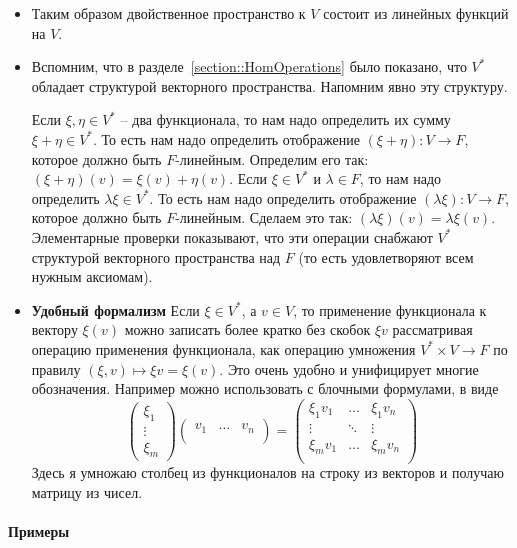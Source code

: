 \begin{itemize}
\item Таким образом двойственное пространство к $V$ состоит из линейных функций на $V$.

\item Вспомним, что в разделе~\ref{section::HomOperations} было показано, что $V^*$ обладает структурой векторного пространства.
Напомним явно эту структуру.

Если $\xi,\eta\in V^*$ -- два функционала, то нам надо определить их сумму $\xi + \eta\in V^*$.
То есть нам надо определить отображение $(\xi + \eta)\colon V\to F$, которое должно быть $F$-линейным.
Определим его так: $(\xi + \eta)(v) = \xi(v) + \eta(v)$.
Если $\xi \in V^*$ и $\lambda\in F$, то нам надо определить $\lambda \xi \in V^*$.
То есть нам надо определить отображение $(\lambda \xi)\colon V\to F$, которое должно быть $F$-линейным.
Сделаем это так: $(\lambda\xi)(v) = \lambda\xi(v)$.
Элементарные проверки показывают, что эти операции снабжают $V^*$ структурой векторного пространства над $F$ (то есть удовлетворяют всем нужным аксиомам).

\item {\bf Удобный формализм} Если $\xi \in V^*$, а $v\in V$, то применение функционала к вектору $\xi(v)$ можно записать более кратко без скобок $\xi v$ рассматривая операцию применения функционала, как операцию умножения $V^*\times V\to F$ по правилу $(\xi, v)\mapsto \xi v = \xi(v)$.
Это очень удобно и унифицирует многие обозначения.
Например можно использовать с блочными формулами, в виде
\[
\begin{pmatrix}
{\xi_1}\\{\vdots}\\{\xi_m}
\end{pmatrix}
\begin{pmatrix}
{v_1}&{\ldots}&{v_n}\\
\end{pmatrix}
=
\begin{pmatrix}
{\xi_1 v_1}&{\ldots}&{\xi_1 v_n}\\
{\vdots}&{\ddots}&{\vdots}\\
{\xi_m v_1}&{\ldots}&{\xi_m v_n}\\
\end{pmatrix}
\]
Здесь я умножаю столбец из функционалов на строку из векторов и получаю матрицу из чисел.
\end{itemize}

\paragraph{Примеры}

